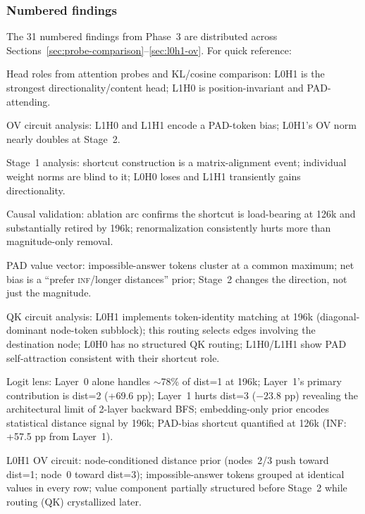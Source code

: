 \documentclass[11pt, a4paper]{article}
\begin{document}
\subsubsection*{Numbered findings}

The 31 numbered findings from Phase~3 are distributed across
Sections~\ref{sec:probe-comparison}--\ref{sec:l0h1-ov}.
For quick reference:

\begin{description}[style=nextline, leftmargin=2.5cm, labelwidth=2cm]
  \item[F1--F4]   Head roles from attention probes and KL/cosine comparison:
                  L0H1 is the strongest directionality/content head; L1H0 is
                  position-invariant and PAD-attending.
  \item[F5--F7]   OV circuit analysis: L1H0 and L1H1 encode a PAD-token bias;
                  L0H1's OV norm nearly doubles at Stage~2.
  \item[F8--F11]  Stage~1 analysis: shortcut construction is a matrix-alignment
                  event; individual weight norms are blind to it; L0H0 loses
                  and L1H1 transiently gains directionality.
  \item[F12--F14] Causal validation: ablation arc confirms the shortcut is
                  load-bearing at 126k and substantially retired by 196k;
                  renormalization consistently hurts more than magnitude-only
                  removal.
  \item[F15--F18] PAD value vector: impossible-answer tokens cluster at a
                  common maximum; net bias is a ``prefer \textsc{inf}/longer
                  distances'' prior; Stage~2 changes the direction, not just
                  the magnitude.
  \item[F19--F22] QK circuit analysis: L0H1 implements token-identity matching
                  at 196k (diagonal-dominant node-token subblock); this routing
                  selects edges involving the destination node; L0H0 has no
                  structured QK routing; L1H0/L1H1 show PAD self-attraction
                  consistent with their shortcut role.
  \item[F23--F28] Logit lens: Layer~0 alone handles $\sim$78\% of dist=1 at
                  196k; Layer~1's primary contribution is dist=2 (+69.6 pp);
                  Layer~1 hurts dist=3 ($-23.8$ pp) revealing the
                  architectural limit of 2-layer backward BFS; embedding-only
                  prior encodes statistical distance signal by 196k; PAD-bias
                  shortcut quantified at 126k (INF: +57.5 pp from Layer~1).
  \item[F29--F31] L0H1 OV circuit: node-conditioned distance prior (nodes~2/3
                  push toward dist=1; node~0 toward dist=3); impossible-answer
                  tokens grouped at identical values in every row; value
                  component partially structured before Stage~2 while routing
                  (QK) crystallized later.
\end{description}
\end{document}
